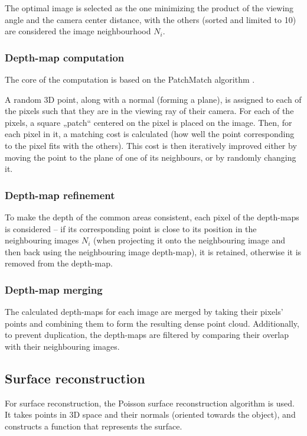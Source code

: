 The optimal image is selected as the one minimizing the product of the viewing angle and the camera center distance, with the others (sorted and limited to 10) are considered the image neighbourhood $N_i$.

\subsubsection{Depth-map computation}
The core of the computation is based on the PatchMatch algorithm \cite{barnes2009PAR}.

A random 3D point, along with a normal (forming a plane), is assigned to each of the pixels such that they are in the viewing ray of their camera.
For each of the pixels, a square „patch“ centered on the pixel is placed on the image.
Then, for each pixel in it, a matching cost is calculated (how well the point corresponding to the pixel fits with the others).
This cost is then iteratively improved either by moving the point to the plane of one of its neighbours, or by randomly changing it.

\subsubsection{Depth-map refinement}
To make the depth of the common areas consistent, each pixel of the depth-maps is considered -- if its corresponding point is close to its position in the neighbouring images $N_i$ (when projecting it onto the neighbouring image and then back using the neighbouring image depth-map), it is retained, otherwise it is removed from the depth-map.

\subsubsection{Depth-map merging}
The calculated depth-maps for each image are merged by taking their pixels' points and combining them to form the resulting dense point cloud.
Additionally, to prevent duplication, the depth-maps are filtered by comparing their overlap with their neighbouring images.

\subsection{Surface reconstruction}
For surface reconstruction, the Poisson surface reconstruction algorithm \cite{kazhdan2006poisson} is used.
It takes points in 3D space and their normals (oriented towards the object), and constructs a function that represents the surface.

